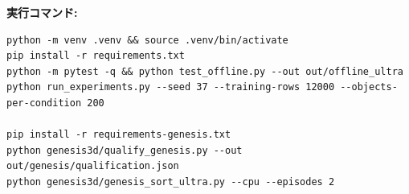 \documentclass[11pt, a4paper]{article}
\begin{document}
\vspace{1mm}
\noindent
\textbf{実行コマンド:}
\begin{verbatim}
python -m venv .venv && source .venv/bin/activate
pip install -r requirements.txt
python -m pytest -q && python test_offline.py --out out/offline_ultra
python run_experiments.py --seed 37 --training-rows 12000 --objects-per-condition 200

pip install -r requirements-genesis.txt
python genesis3d/qualify_genesis.py --out out/genesis/qualification.json
python genesis3d/genesis_sort_ultra.py --cpu --episodes 2
\end{verbatim}
\end{document}

